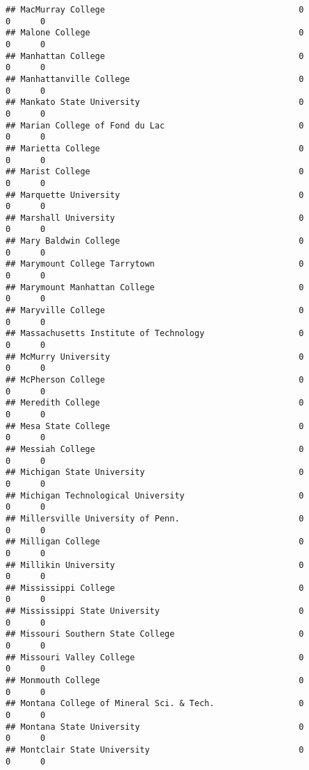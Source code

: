 \documentclass[
]{article}
\begin{document}
\begin{verbatim}
## MacMurray College                                       0          0      0
## Malone College                                          0          0      0
## Manhattan College                                       0          0      0
## Manhattanville College                                  0          0      0
## Mankato State University                                0          0      0
## Marian College of Fond du Lac                           0          0      0
## Marietta College                                        0          0      0
## Marist College                                          0          0      0
## Marquette University                                    0          0      0
## Marshall University                                     0          0      0
## Mary Baldwin College                                    0          0      0
## Marymount College Tarrytown                             0          0      0
## Marymount Manhattan College                             0          0      0
## Maryville College                                       0          0      0
## Massachusetts Institute of Technology                   0          0      0
## McMurry University                                      0          0      0
## McPherson College                                       0          0      0
## Meredith College                                        0          0      0
## Mesa State College                                      0          0      0
## Messiah College                                         0          0      0
## Michigan State University                               0          0      0
## Michigan Technological University                       0          0      0
## Millersville University of Penn.                        0          0      0
## Milligan College                                        0          0      0
## Millikin University                                     0          0      0
## Mississippi College                                     0          0      0
## Mississippi State University                            0          0      0
## Missouri Southern State College                         0          0      0
## Missouri Valley College                                 0          0      0
## Monmouth College                                        0          0      0
## Montana College of Mineral Sci. & Tech.                 0          0      0
## Montana State University                                0          0      0
## Montclair State University                              0          0      0

\end{verbatim}
\end{document}
